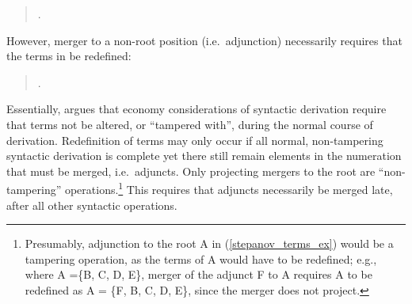 \singlespacing
\begin{quote}
\ex.

\end{quote}
\onehalfspacing
However, merger to a non-root position (i.e.\ adjunction) necessarily requires that the terms in \LLast[b] be redefined:

\singlespacing
\begin{quote}
\ex.

\end{quote}
\onehalfspacing
Essentially, \citeauthor{stepanov2000} argues that economy considerations of syntactic derivation require that terms not be altered, or ``tampered with'', during the normal course of derivation. Redefinition of terms may only occur if all normal, non-tampering syntactic derivation is complete yet there still remain elements in the numeration that must be merged, i.e.\ adjuncts. Only projecting mergers to the root are ``non-tampering'' operations.\footnote{Presumably, adjunction to the root A in (\ref{stepanov_terms_ex}) would be a tampering operation, as the terms of A would have to be redefined; e.g., where A =\{B, C, D, E\}, merger of the adjunct F to A requires A to be redefined as A = \{F, B, C, D, E\}, since the merger does not project.} This requires that adjuncts necessarily be merged late, after all other syntactic operations.


